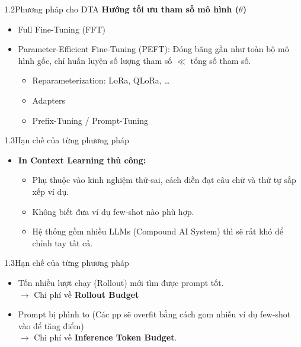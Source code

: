 \begin{frame}{1.2\quad Phương pháp cho DTA}
  \textbf{Hướng tối ưu tham số mô hình ({\color{PaperGreen}$\theta$})}
  \begin{itemize}\tightlist
    \item Full Fine-Tuning (FFT)
    \item Parameter-Efficient Fine-Tuning (PEFT): Đóng băng gần như toàn bộ mô hình gốc,
          chỉ huấn luyện số lượng tham số $\ll$ tổng số tham số.
      \begin{itemize}\tightlist\normalsize
        \item Reparameterization: LoRa, QLoRa, \dots
        \item Adapters
        \item Prefix-Tuning / Prompt-Tuning
      \end{itemize}
  \end{itemize}
\end{frame}

\begin{frame}{1.3\quad Hạn chế của từng phương pháp}
  \begin{itemize}\tightlist
    \item \textbf{In Context Learning thủ công:}
      \begin{itemize}\tightlist\normalsize
        \item Phụ thuộc vào kinh nghiệm thử-sai, cách diễn đạt câu chữ và thứ tự sắp xếp
              ví dụ.
        \item Không biết đưa ví dụ few-shot nào phù hợp.
        \item Hệ thống gồm nhiều LLMs (Compound AI System) thì sẽ rất khó để chỉnh tay
              tất cả.
      \end{itemize}
  \end{itemize}
\end{frame}

\begin{frame}{1.3\quad Hạn chế của từng phương pháp}
  \begin{itemize}\setlength{\itemsep}{0.6em}
    \item Tốn nhiều lượt chạy (Rollout) mới tìm được prompt tốt.\\
          $\rightarrow$ Chi phí về \textbf{Rollout Budget}
    \item Prompt bị phình to (Các pp sẽ overfit bằng cách gom nhiều ví dụ few-shot vào
          để tăng điểm)\\
          $\rightarrow$ Chi phí về \textbf{Inference Token Budget}.
  \end{itemize}
\end{frame}

